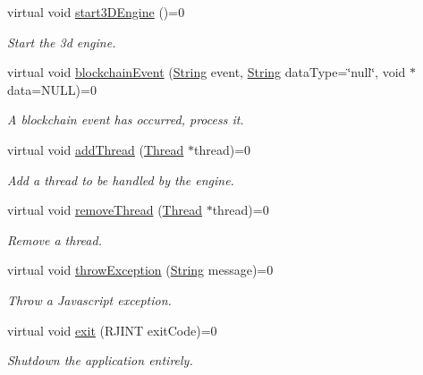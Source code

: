 \begin{DoxyCompactItemize}
virtual void \mbox{\hyperlink{class_rad_j_a_v_1_1_javascript_engine_a76c00d87d65f69781e2dc4aa3143acac}{start3\+D\+Engine}} ()=0
\begin{DoxyCompactList}\small\item\em Start the 3d engine. \end{DoxyCompactList}\item 
virtual void \mbox{\hyperlink{class_rad_j_a_v_1_1_javascript_engine_a91ebe8029a9658f66d9c39356eea2d80}{blockchain\+Event}} (\mbox{\hyperlink{class_rad_j_a_v_1_1_string}{String}} event, \mbox{\hyperlink{class_rad_j_a_v_1_1_string}{String}} data\+Type=\char`\"{}null\char`\"{}, void $\ast$data=N\+U\+LL)=0
\begin{DoxyCompactList}\small\item\em A blockchain event has occurred, process it. \end{DoxyCompactList}\item 
virtual void \mbox{\hyperlink{class_rad_j_a_v_1_1_javascript_engine_abfbd3bff5d4eb0e36d3d18347495bbd7}{add\+Thread}} (\mbox{\hyperlink{class_rad_j_a_v_1_1_thread}{Thread}} $\ast$thread)=0
\begin{DoxyCompactList}\small\item\em Add a thread to be handled by the engine. \end{DoxyCompactList}\item 
virtual void \mbox{\hyperlink{class_rad_j_a_v_1_1_javascript_engine_afe08c6324e3958a5d3ec82fa9e0f1fd1}{remove\+Thread}} (\mbox{\hyperlink{class_rad_j_a_v_1_1_thread}{Thread}} $\ast$thread)=0
\begin{DoxyCompactList}\small\item\em Remove a thread. \end{DoxyCompactList}\item 
virtual void \mbox{\hyperlink{class_rad_j_a_v_1_1_javascript_engine_ab9f13c1928d6967122d0f9a6a026dc73}{throw\+Exception}} (\mbox{\hyperlink{class_rad_j_a_v_1_1_string}{String}} message)=0
\begin{DoxyCompactList}\small\item\em Throw a Javascript exception. \end{DoxyCompactList}\item 
virtual void \mbox{\hyperlink{class_rad_j_a_v_1_1_javascript_engine_a4a720b2e36ab737ab0b697e9b7317fb0}{exit}} (R\+J\+I\+NT exit\+Code)=0
\begin{DoxyCompactList}\small\item\em Shutdown the application entirely. \end{DoxyCompactList}\end{DoxyCompactItemize}
